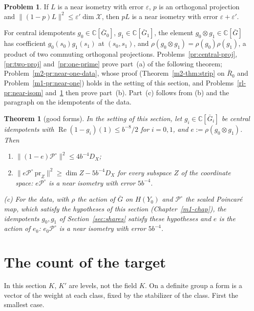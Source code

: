 \documentclass[reqno]{amsart}
\newcounter{chap}
\theoremstyle{plain}
\newtheorem{theorem}{Theorem}[section]
\theoremstyle{definition}
\newtheorem{problem}{Problem}[section]
\theoremstyle{remark}
\newcommand{\C}{\mathbb{C}}
\newcommand{\Gb}{\bar G}
\newcommand{\Rb}{\bar R_0}
\newcommand{\Po}{{\mathcal P^\circ}}
\newcommand{\pr}{\mathrm{pr}}
\begin{document}
\begin{problem}\label{pr:proj-comp}
If \(L\) is a near isometry with error \(\varepsilon\), \(p\) is an orthogonal projection and \(\lVert(1-p)L\rVert^2\le\varepsilon'\dim\mathcal X\), then \(pL\) is a near isometry with error \(\varepsilon+\varepsilon'\).
\end{problem}

For central idempotents \(g_0 \in \C[\Gb_0]\), \(g_1 \in \C[\Gb_1]\), the element \(g_0 \otimes g_1 \in \C[\Gb]\) has coefficient \(g_0(s_0)g_1(s_1)\) at \((s_0, s_1)\), and \(\rho(g_0 \otimes g_1) = \rho(g_0)\rho(g_1)\), a product of two commuting orthogonal projections.  Problems~\ref{pr:central-proj}, \ref{pr:two-proj} and~\ref{pr:one-prime} prove part~(a) of the following theorem; Problem~\ref{m2-pr:near-one-data}, whose proof (Theorem~\ref{m2-thm:strip} on \(\Rb\) and Problem~\ref{m1-pr:near-one}) holds in the setting of this section, and Problems~\ref{rl-pr:near-isom} and~\ref{pr:proj-comp} then prove part~(b).  Part~(c) follows from (b) and the paragraph on the idempotents of the data.

\begin{theorem}[good forms]\label{thm:good}
In the setting of this section, let \(g_i \in \C[\Gb_i]\) be central idempotents with \(\operatorname{Re}(1 - g_i)(1) \le b^{-8}/2\) for \(i = 0, 1\), and \(e := \rho(g_0 \otimes g_1)\).  Then
\begin{enumerate}
\item[(a)] \(\lVert(1 - e)\Po\rVert^2 \le 4b^{-4}D_X\);
\item[(b)] \(\lVert e\Po\,\pr_Z\rVert^2 \ge \dim Z - 5b^{-4}D_X\) for every subspace \(Z\) of the coordinate space: \(e\Po\) is a near isometry with error \(5b^{-4}\).
\end{enumerate}
(c) For the data, with \(\rho\) the action of \(\Gb\) on \(H(Y_0)\) and \(\Po\) the scaled Poincar\'e map, which satisfy the hypotheses of this section (Chapter~\ref{m1-chap}), the idempotents \(g_0, g_1\) of Section~\ref{sec:shares} satisfy these hypotheses and \(e\) is the action of \(e_0\): \(e_0\Po\) is a near isometry with error \(5b^{-4}\).
\end{theorem}

\section{The count of the target}\label{sec:count}

In this section \(K\), \(K'\) are levels, not the field \(K\).  On a definite group a form is a vector of the weight at each class, fixed by the stabilizer of the class.  First the smallest case.
\end{document}
